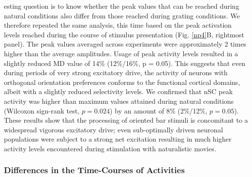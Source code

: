 esting  question is to know whether the peak values that can be reached
during natural conditions also differ from those reached during grating
conditions. We therefore repeated the same analysis, this time based on the
peak activation levels reached during the course of stimulus presentation
(Fig. \ref{np4}B, rightmost panel). The peak values averaged across
experiments were approximately 2 times higher than the average amplitudes.
Usage of peak activity levels resulted in a slightly reduced MD
 value of 14\% (12\%/16\%, p = 0.05).
This suggests that even during periods of very strong excitatory drive, the
activity of neurons with orthogonal orientation preferences conforms to the
functional cortical domains, albeit with a slightly reduced selectivity
levels. We confirmed that nSC peak activity was higher than maximum values
attained during natural conditions (Wilcoxon sign-rank test, $p = 0.024$)
by an amount of 8\% (2\%/12\%, $p = 0.05$). These results show that the
processing of oriented bar stimuli is concomitant to a widespread vigorous
excitatory drive; even sub-optimally driven neuronal populations were
subject to a strong net excitation resulting in much higher activity levels
encountered during stimulation with naturalistic movies.


\subsubsection{Differences in the Time-Courses of Activities}

